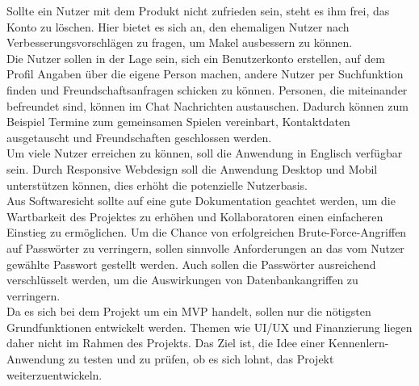Sollte ein Nutzer mit dem Produkt nicht zufrieden sein, steht es ihm frei, das Konto zu löschen.
Hier bietet es sich an, den ehemaligen Nutzer nach Verbesserungsvorschlägen zu fragen, um Makel ausbessern zu können.\\

Die Nutzer sollen in der Lage sein, sich ein Benutzerkonto erstellen, auf dem Profil Angaben über die eigene Person machen, andere Nutzer per Suchfunktion finden und Freundschaftsanfragen schicken zu können.
Personen, die miteinander befreundet sind, können im Chat Nachrichten austauschen.
Dadurch können zum Beispiel Termine zum gemeinsamen Spielen vereinbart, Kontaktdaten ausgetauscht und Freundschaften geschlossen werden.\\


Um viele Nutzer erreichen zu können, soll die Anwendung in Englisch verfügbar sein.
Durch Responsive Webdesign
soll die Anwendung Desktop und Mobil unterstützen können, dies erhöht die potenzielle Nutzerbasis.\\

Aus Softwaresicht sollte auf eine gute Dokumentation geachtet werden, um die Wartbarkeit des Projektes zu erhöhen und Kollaboratoren einen einfacheren Einstieg zu ermöglichen.
Um die Chance von erfolgreichen Brute-Force-Angriffen auf Passwörter zu verringern, sollen sinnvolle Anforderungen an das vom Nutzer gewählte Passwort gestellt werden.
Auch sollen die Passwörter ausreichend verschlüsselt werden, um die Auswirkungen von Datenbankangriffen zu verringern.\\

Da es sich bei dem Projekt um ein MVP handelt, sollen nur die nötigsten Grundfunktionen entwickelt werden.
Themen wie UI/UX und Finanzierung liegen daher nicht im Rahmen des Projekts.
Das Ziel ist, die Idee einer Kennenlern-Anwendung zu testen und zu prüfen, ob es sich lohnt, das Projekt weiterzuentwickeln. 